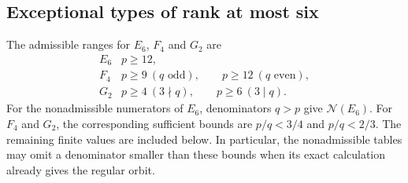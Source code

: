 \documentclass[11pt,a4paper]{amsart}
\numberwithin{equation}{section}
\theoremstyle{definition}
\theoremstyle{remark}
\newcommand{\N}{\mathcal N}
\begin{document}
\subsection{Exceptional types of rank at most six}
The admissible ranges for $E_6$, $F_4$ and $G_2$ are
$$
\begin{array}{c|l}
E_6&p\ge12,\\
F_4&p\ge9\ (q\text{ odd}),\qquad p\ge12\ (q\text{ even}),\\
G_2&p\ge4\ (3\nmid q),\qquad p\ge6\ (3\mid q).
\end{array}
$$
For the nonadmissible numerators of $E_6$, denominators $q>p$ give
$\N(E_6)$. For $F_4$ and $G_2$, the corresponding sufficient bounds
are $p/q<3/4$ and $p/q<2/3$. The remaining finite values are included
below. In particular, the nonadmissible tables may omit a denominator
smaller than these bounds when its exact calculation already gives the
regular orbit.
\end{document}
